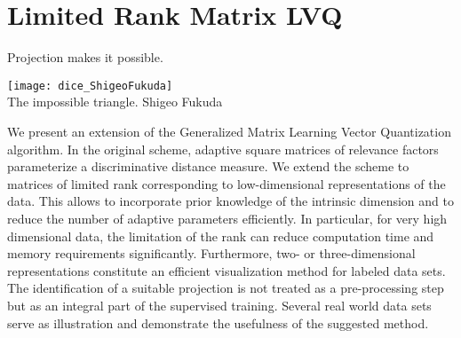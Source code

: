 

\renewcommand{\publ}{\flushleft\footnotesize{Published as:\\[0.1cm]
K. Bunte, P. Schneider, B. Hammer, F.-M. Schleif, T. Villmann and M. Biehl -- \textit{``Discriminative Visualization by Limited Rank Matrix Learning,''} Leipzig University, Machine Learning Reports (2:3), %
pp. 37--51, 2008.\\[0.1cm]
K. Bunte, P. Schneider, B. Hammer, F.-M. Schleif, T. Villmann and M. Biehl -- \textit{``Limited Rank Matrix Learning Discriminative Dimension Reduction and Visualization,''} accepted for publication in Neural Networks 2011.\\}}

\chapter{Limited Rank Matrix LVQ}
\label{chapter:LiRaMLVQ}

\epigraph{Projection makes it possible.}{\texttt{[image: dice\_ShigeoFukuda]}\\The impossible triangle. Shigeo Fukuda}



\begin{Abstract}
We present an extension of the %
Generalized Matrix Learning Vector Quantization algorithm. 
In the original scheme, adaptive square matrices of relevance factors parameterize a discriminative distance measure. 
We extend the scheme to matrices of limited rank corresponding to low-dimensional representations of the data. 
This allows to incorporate prior knowledge of the intrinsic dimension and to reduce the number of adaptive parameters efficiently. 
In particular, for very high dimensional data, the limitation of the rank can reduce computation time 
and memory requirements significantly. 
Furthermore, two- or three-dimensional representations constitute an efficient visualization method for labeled data sets. 
The identification of a suitable projection is not treated as a pre-processing step but as an integral part of the supervised training.  
Several real world data sets serve as illustration and demonstrate the usefulness of the suggested method.
\end{Abstract}

